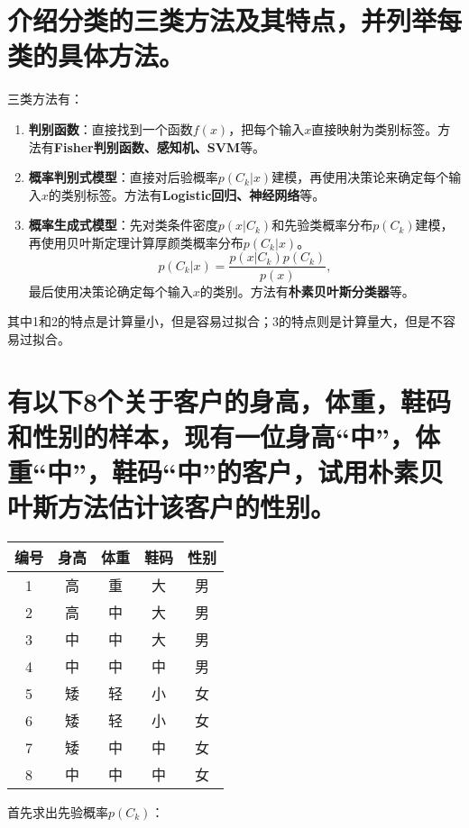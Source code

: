 \documentclass{article}
\begin{document}
\section{介绍分类的三类方法及其特点，并列举每类的具体方法。}

三类方法有：
\begin{enumerate}
    \item \textbf{判别函数}：直接找到一个函数$f(x)$，把每个输入$x$直接映射为类别标签。方法有\textbf{Fisher判别函数、感知机、SVM}等。
    \item \textbf{概率判别式模型}：直接对后验概率$p(C_k|x)$建模，再使用决策论来确定每个输入$x$的类别标签。方法有\textbf{Logistic回归、神经网络}等。
    \item \textbf{概率生成式模型}：先对类条件密度$p(x|C_k)$和先验类概率分布$p(C_k)$建模，再使用贝叶斯定理计算厚颜类概率分布$p(C_k|x)$。
          $$
          p(C_k|x)=\frac{p(x|C_k)p(C_k)}{p(x)},
          $$
          最后使用决策论确定每个输入$x$的类别。方法有\textbf{朴素贝叶斯分类器}等。
\end{enumerate}

其中1和2的特点是计算量小，但是容易过拟合；3的特点则是计算量大，但是不容易过拟合。

\section{有以下8个关于客户的身高，体重，鞋码和性别的样本，现有一位身高“中”，体重“中”，鞋码“中”的客户，试用朴素贝叶斯方法估计该客户的性别。}

\begin{table}[h]
    \centering
    \begin{tabular}{|c|c|c|c|c|}
        \hline
        编号 & 身高 & 体重 & 鞋码 & 性别 \\
        \hline
        1 & 高 & 重 & 大 & 男 \\
        2 & 高 & 中 & 大 & 男 \\
        3 & 中 & 中 & 大 & 男 \\
        4 & 中 & 中 & 中 & 男 \\
        5 & 矮 & 轻 & 小 & 女 \\
        6 & 矮 & 轻 & 小 & 女 \\
        7 & 矮 & 中 & 中 & 女 \\
        8 & 中 & 中 & 中 & 女 \\
        \hline
    \end{tabular}
\end{table}

首先求出先验概率$p(C_k)$：
\end{document}
